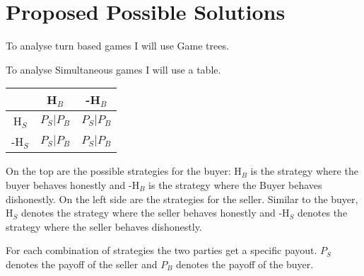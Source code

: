 \documentclass{cacthesis}
\begin{document}
\chapter{Proposed Possible Solutions}
To analyse turn based games I will use Game trees. 

To analyse Simultaneous games I will use a table.
\begin{center}
\begin{tabular}{ c||c|c| }
& H$_B$ & -H$_B$  \\
\hline
\hline
H$_S$ & $P_S | P_B$ & $P_S | P_B$ \\
\hline
-H$_S$ & $P_S | P_B$ & $P_S | P_B$ \\ 
\hline
\end{tabular}
\end{center}

 On the top are the possible strategies for the buyer: H$_B$ is the strategy where the buyer behaves honestly and -H$_B$ is the strategy where the Buyer behaves dishonestly.\newline
On the left side are the strategies for the seller. Similar to the buyer, H$_S$ denotes the strategy where the seller behaves honestly and -H$_S$ denotes the strategy where the seller behaves dishonestly.\newline

For each combination of strategies the two parties get a specific payout. $P_S$ denotes the payoff of the seller and $P_B$ denotes the payoff of the buyer.
\end{document}
